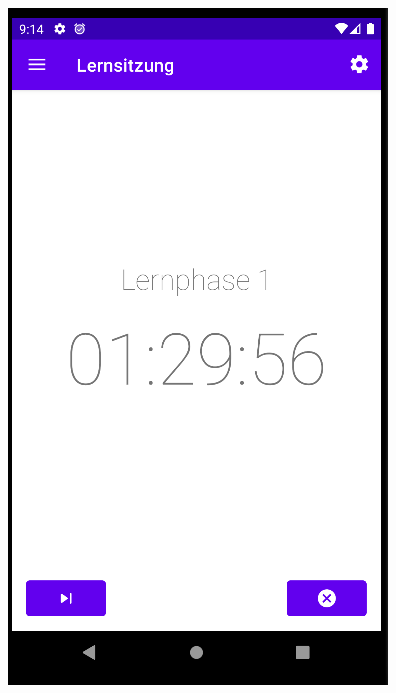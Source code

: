 \documentclass[ngerman]{tutorial}
\begin{document}
\begin{center}
    \includegraphics[scale=0.45]{learn_screen.png}
\end{center}
\end{document}
